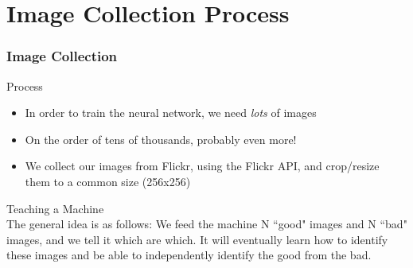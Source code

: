 \documentclass{beamer}
\begin{document}
\section{Image Collection Process}

\begin{frame}
  \frametitle{Image Collection}
    \alert{Process}
    \begin{itemize}
    \item In order to train the neural network, we need \emph{lots} of images
    \item On the order of tens of thousands, probably even more!
    \item We collect our images from Flickr, using the Flickr API, and crop/resize them to a common size (256x256)
    \end{itemize}
    \alert{Teaching a Machine} \\
    The general idea is as follows: We feed the machine N ``good" images and N ``bad" images, and we tell it which are which. It will eventually learn how to identify these images and be able to independently identify the good from the bad.

\end{frame}
\end{document}
